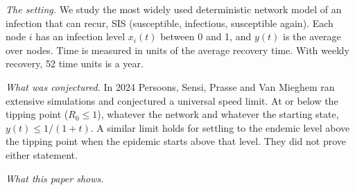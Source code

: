 \documentclass[
  11pt,
  a4paper,
]{article}
\begin{document}
\emph{The setting.} We study the most widely used deterministic network
model of an infection that can recur, SIS (susceptible, infectious,
susceptible again). Each node \(i\) has an infection level \(x_i(t)\)
between 0 and 1, and \(y(t)\) is the average over nodes. Time is
measured in units of the average recovery time. With weekly recovery, 52
time units is a year.

\emph{What was conjectured.} In 2024 Persoons, Sensi, Prasse and Van
Mieghem ran extensive simulations and conjectured a universal speed
limit. At or below the tipping point (\(R_0\le1\)), whatever the network
and whatever the starting state, \(y(t)\le1/(1+t)\). A similar limit
holds for settling to the endemic level above the tipping point when the
epidemic starts above that level. They did not prove either statement.

\emph{What this paper shows.}
\end{document}
